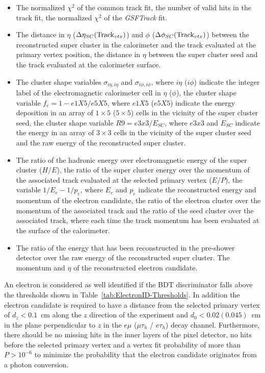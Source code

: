 \begin{itemize}
\item
The normalized $\chi^{2}$ of the common track fit, the number of valid hits in the track fit, the normalized
$\chi^{2}$ of the {\it GSFTrack} fit.
\item
The distance in $\eta$ ($\Delta\eta_{SC}({\rm Track}_{vtx})$) and $\phi$ ($\Delta\phi_{SC}({\rm Track}_{vtx})$)
between the reconstructed super cluster in the calorimeter and the track evaluated at the primary vertex
position, the distance in $\eta$ between the super cluster seed and the track evaluated at the calorimeter
surface.
\item
The cluster shape variables $\sigma_{i\eta,i\eta}$ and $\sigma_{i\phi, i\phi}$, where $i\eta$ ($i\phi$)
indicate the integer label of the electromagnetic calorimeter cell in $\eta$ ($\phi$), the cluster shape
variable $f_{e}=1-e1X5/e5X5$, where $e1X5$ ($e5X5$) indicate the energy deposition in an array of $1 \times 5$
($5 \times 5$) cells in the vicinity of the super cluster seed, the cluster shape variable $R9 = e3x3/E_{SC}$,
where $e3x3$ and $E_{SC}$ indicate the energy in an array of $3 \times 3$ cells in the vicinity of the
super cluster seed and the raw energy of the reconstructed super cluster.
\item
The ratio of the hadronic energy over electromagnetic energy of the super cluster ($H/E$), the ratio of
the super cluster energy over the momentum of the associated track evaluated at the selected primary vertex
($E/P$), the variable $1/E_{e}-1/p_{e}$, where $E_{e}$ and $p_{e}$ indicate the reconstructed energy and
momentum of the electron candidate, the ratio of the electron cluster over the momentum of the associated
track and the ratio of the seed cluster over the associated track, where each time the track momentum
has been evaluated at the surface of the calorimeter.
\item
The ratio of the energy that has been reconstructed in the pre-shower detector over the raw energy of
the reconstructed super cluster. The momentum and $\eta$ of the reconstructed electron candidate.
\end{itemize}

An electron is considered as well identified if the BDT discriminator falls above the thresholds shown
in Table~\ref{tab:ElectronID-Thresholds}\@. In addition the electron candidate is required to have a
distance from the selected primary vertex of $d_{z}<0.1$~cm along the $z$ direction of the experiment
 and $d_{0}<0.02 (0.045)$~cm in the plane perpendicular to $z$ in the $e\mu$ ($\mu\tau_{h}$ / $e\tau_{h}$)
decay channel. Furthermore, there should be no missing hits in the inner layers of the pixel detector, no
hits before the selected primary vertex and a vertex fit probability of more than $P>10^{-6}$ to minimize the probability that the electron candidate originates from a photon conversion.

